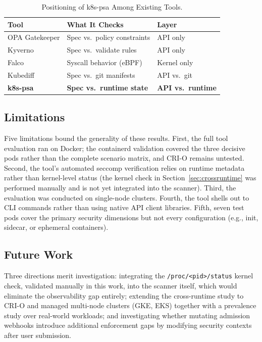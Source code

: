 \documentclass[sigconf]{acmart}
\begin{document}
\begin{table}[htbp]
\caption{Positioning of k8s-psa Among Existing Tools.}
\label{tab:tools}
\centering
\begin{tabular}{lll}
\toprule
\textbf{Tool} & \textbf{What It Checks} & \textbf{Layer} \\
\midrule
OPA Gatekeeper & Spec vs.\ policy constraints & API only \\
Kyverno        & Spec vs.\ validate rules & API only \\
Falco          & Syscall behavior (eBPF) & Kernel only \\
Kubediff       & Spec vs.\ git manifests & API vs.\ git \\
\textbf{k8s-psa} & \textbf{Spec vs.\ runtime state} & \textbf{API vs.\ runtime} \\
\bottomrule
\end{tabular}
\end{table}

\subsection{Limitations}

Five limitations bound the generality of these results. First, the full tool evaluation ran on Docker; the containerd validation covered the three decisive pods rather than the complete scenario matrix, and CRI-O remains untested. Second, the tool's automated seccomp verification relies on runtime metadata rather than kernel-level status (the kernel check in Section~\ref{sec:crossruntime} was performed manually and is not yet integrated into the scanner). Third, the evaluation was conducted on single-node clusters. Fourth, the tool shells out to CLI commands rather than using native API client libraries. Fifth, seven test pods cover the primary security dimensions but not every configuration (e.g., init, sidecar, or ephemeral containers).

\subsection{Future Work}

Three directions merit investigation: integrating the \texttt{/proc/<pid>/status} kernel check, validated manually in this work, into the scanner itself, which would eliminate the observability gap entirely; extending the cross-runtime study to CRI-O and managed multi-node clusters (GKE, EKS) together with a prevalence study over real-world workloads; and investigating whether mutating admission webhooks introduce additional enforcement gaps by modifying security contexts after user submission.
\end{document}
